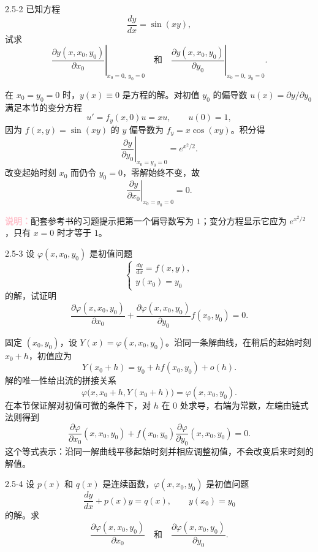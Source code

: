\documentclass[UTF8,a4paper,11pt]{ctexart}
\newcommand{\note}[1]{\par\smallskip\noindent\textcolor{pink}{\bfseries 说明：}#1\par\smallskip}
\begin{document}
\begin{problem}{2.5-2}
已知方程
  \[
    \frac{dy}{dx}=\sin(xy),
  \]
  试求
  \[
    \left.\frac{\partial y(x,x_0,y_0)}{\partial x_0}\right|_{x_0=0,\ y_0=0}
    \quad\text{和}\quad
    \left.\frac{\partial y(x,x_0,y_0)}{\partial y_0}\right|_{x_0=0,\ y_0=0}.
  \]
\end{problem}

\begin{solution}
在 $x_0=y_0=0$ 时，$y(x)\equiv0$ 是方程的解。对初值 $y_0$ 的偏导数 $u(x)=\partial y/\partial y_0$ 满足本节的变分方程
\[
u'=f_y(x,0)u=xu,\qquad u(0)=1,
\]
因为 $f(x,y)=\sin(xy)$ 的 $y$ 偏导数为 $f_y=x\cos(xy)$。积分得
\[
\boxed{\left.\frac{\partial y}{\partial y_0}\right|_{x_0=y_0=0}
=e^{x^2/2}}.
\]
改变起始时刻 $x_0$ 而仍令 $y_0=0$，零解始终不变，故
\[
\boxed{\left.\frac{\partial y}{\partial x_0}\right|_{x_0=y_0=0}=0}.
\]
\note{配套参考书的习题提示把第一个偏导数写为 $1$；变分方程显示它应为 $e^{x^2/2}$，只有 $x=0$ 时才等于 $1$。}
\end{solution}

\begin{problem}{2.5-3}
设 $\varphi(x,x_0,y_0)$ 是初值问题
  \[
  \begin{cases}
    \displaystyle \frac{dy}{dx}=f(x,y),\\
    y(x_0)=y_0
  \end{cases}
  \]
  的解，试证明
  \[
    \frac{\partial\varphi(x,x_0,y_0)}{\partial x_0}
    +
    \frac{\partial\varphi(x,x_0,y_0)}{\partial y_0}f(x_0,y_0)=0.
  \]
\end{problem}

\begin{solution}
固定 $(x_0,y_0)$，设 $Y(x)=\varphi(x,x_0,y_0)$。沿同一条解曲线，在稍后的起始时刻 $x_0+h$，初值应为
\[
Y(x_0+h)=y_0+h f(x_0,y_0)+o(h).
\]
解的唯一性给出流的拼接关系
\[
\varphi\bigl(x,x_0+h,Y(x_0+h)\bigr)
=\varphi(x,x_0,y_0).
\]
在本节保证解对初值可微的条件下，对 $h$ 在 $0$ 处求导，右端为常数，左端由链式法则得到
\[
\boxed{\frac{\partial\varphi}{\partial x_0}(x,x_0,y_0)
+f(x_0,y_0)\frac{\partial\varphi}{\partial y_0}(x,x_0,y_0)=0}.
\]
这个等式表示：沿同一解曲线平移起始时刻并相应调整初值，不会改变后来时刻的解值。
\end{solution}

\begin{problem}{2.5-4}
设 $p(x)$ 和 $q(x)$ 是连续函数，$\varphi(x,x_0,y_0)$ 是初值问题
  \[
    \frac{dy}{dx}+p(x)y=q(x),\qquad y(x_0)=y_0
  \]
  的解。求
  \[
    \frac{\partial\varphi(x,x_0,y_0)}{\partial x_0}
    \quad\text{和}\quad
    \frac{\partial\varphi(x,x_0,y_0)}{\partial y_0}.
  \]
\end{problem}
\end{document}
